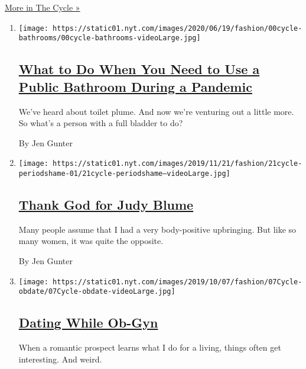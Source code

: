 \href{/column/the-cycle}{More in The Cycle »}

\begin{enumerate}
\def\labelenumi{\arabic{enumi}.}
\item
  \texttt{[image: https://static01.nyt.com/images/2020/06/19/fashion/00cycle-bathrooms/00cycle-bathrooms-videoLarge.jpg]}

  \hypertarget{what-to-do-when-you-need-to-use-a-public-bathroom-during-a-pandemic}{%
  \subsection{\texorpdfstring{\href{/2020/06/24/style/coronavirus-public-bathrooms.html}{What
  to Do When You Need to Use a Public Bathroom During a
  Pandemic}}{What to Do When You Need to Use a Public Bathroom During a Pandemic}}\label{what-to-do-when-you-need-to-use-a-public-bathroom-during-a-pandemic}}

  We've heard about toilet plume. And now we're venturing out a little
  more. So what's a person with a full bladder to do?

  By Jen Gunter
\item
  \texttt{[image: https://static01.nyt.com/images/2019/11/21/fashion/21cycle-periodshame-01/21cycle-periodshame--videoLarge.jpg]}

  \hypertarget{thank-god-for-judy-blume}{%
  \subsection{\texorpdfstring{\href{/2019/11/21/style/menstrual-diarrhea-happens.html}{Thank
  God for Judy
  Blume}}{Thank God for Judy Blume}}\label{thank-god-for-judy-blume}}

  Many people assume that I had a very body-positive upbringing. But
  like so many women, it was quite the opposite.

  By Jen Gunter
\item
  \texttt{[image: https://static01.nyt.com/images/2019/10/07/fashion/07Cycle-obdate/07Cycle-obdate-videoLarge.jpg]}

  \hypertarget{dating-while-ob-gyn}{%
  \subsection{\texorpdfstring{\href{/2019/10/08/style/dating-while-ob-gyn.html}{Dating
  While Ob-Gyn}}{Dating While Ob-Gyn}}\label{dating-while-ob-gyn}}

  When a romantic prospect learns what I do for a living, things often
  get interesting. And weird.


\end{enumerate}

